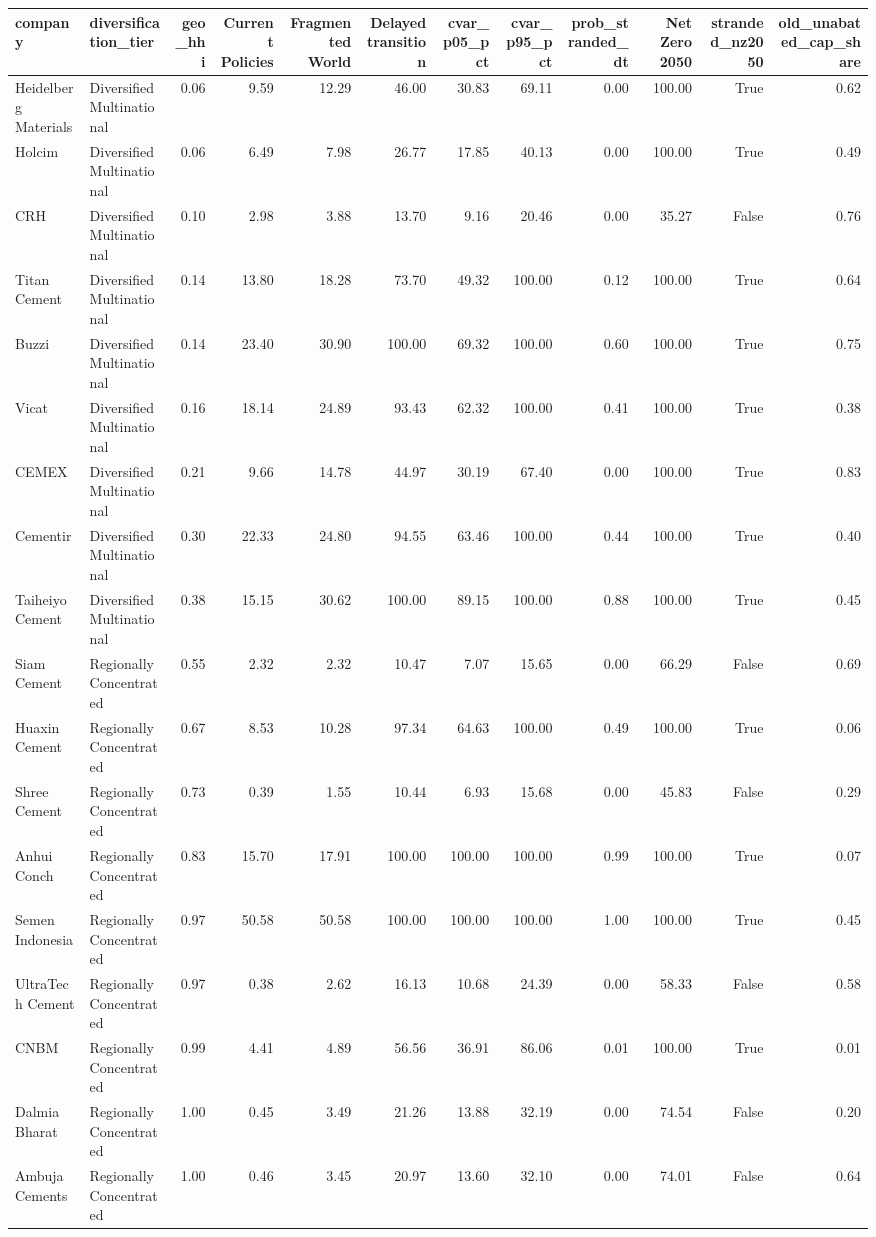 \begin{tabular}{llrrrrrrrrrr}
\toprule
company & diversification_tier & geo_hhi & Current Policies & Fragmented World & Delayed transition & cvar_p05_pct & cvar_p95_pct & prob_stranded_dt & Net Zero 2050 & stranded_nz2050 & old_unabated_cap_share \\
\midrule
Heidelberg Materials & Diversified Multinational & 0.06 & 9.59 & 12.29 & 46.00 & 30.83 & 69.11 & 0.00 & 100.00 & True & 0.62 \\
Holcim & Diversified Multinational & 0.06 & 6.49 & 7.98 & 26.77 & 17.85 & 40.13 & 0.00 & 100.00 & True & 0.49 \\
CRH & Diversified Multinational & 0.10 & 2.98 & 3.88 & 13.70 & 9.16 & 20.46 & 0.00 & 35.27 & False & 0.76 \\
Titan Cement & Diversified Multinational & 0.14 & 13.80 & 18.28 & 73.70 & 49.32 & 100.00 & 0.12 & 100.00 & True & 0.64 \\
Buzzi & Diversified Multinational & 0.14 & 23.40 & 30.90 & 100.00 & 69.32 & 100.00 & 0.60 & 100.00 & True & 0.75 \\
Vicat & Diversified Multinational & 0.16 & 18.14 & 24.89 & 93.43 & 62.32 & 100.00 & 0.41 & 100.00 & True & 0.38 \\
CEMEX & Diversified Multinational & 0.21 & 9.66 & 14.78 & 44.97 & 30.19 & 67.40 & 0.00 & 100.00 & True & 0.83 \\
Cementir & Diversified Multinational & 0.30 & 22.33 & 24.80 & 94.55 & 63.46 & 100.00 & 0.44 & 100.00 & True & 0.40 \\
Taiheiyo Cement & Diversified Multinational & 0.38 & 15.15 & 30.62 & 100.00 & 89.15 & 100.00 & 0.88 & 100.00 & True & 0.45 \\
Siam Cement & Regionally Concentrated & 0.55 & 2.32 & 2.32 & 10.47 & 7.07 & 15.65 & 0.00 & 66.29 & False & 0.69 \\
Huaxin Cement & Regionally Concentrated & 0.67 & 8.53 & 10.28 & 97.34 & 64.63 & 100.00 & 0.49 & 100.00 & True & 0.06 \\
Shree Cement & Regionally Concentrated & 0.73 & 0.39 & 1.55 & 10.44 & 6.93 & 15.68 & 0.00 & 45.83 & False & 0.29 \\
Anhui Conch & Regionally Concentrated & 0.83 & 15.70 & 17.91 & 100.00 & 100.00 & 100.00 & 0.99 & 100.00 & True & 0.07 \\
Semen Indonesia & Regionally Concentrated & 0.97 & 50.58 & 50.58 & 100.00 & 100.00 & 100.00 & 1.00 & 100.00 & True & 0.45 \\
UltraTech Cement & Regionally Concentrated & 0.97 & 0.38 & 2.62 & 16.13 & 10.68 & 24.39 & 0.00 & 58.33 & False & 0.58 \\
CNBM & Regionally Concentrated & 0.99 & 4.41 & 4.89 & 56.56 & 36.91 & 86.06 & 0.01 & 100.00 & True & 0.01 \\
Dalmia Bharat & Regionally Concentrated & 1.00 & 0.45 & 3.49 & 21.26 & 13.88 & 32.19 & 0.00 & 74.54 & False & 0.20 \\
Ambuja Cements & Regionally Concentrated & 1.00 & 0.46 & 3.45 & 20.97 & 13.60 & 32.10 & 0.00 & 74.01 & False & 0.64 \\
\bottomrule
\end{tabular}
